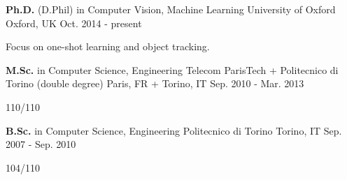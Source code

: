 

\begin{cventries}

  \cventry
    {\textbf{Ph.D.} (D.Phil) in Computer Vision, Machine Learning} %
    {University of Oxford} %
    {Oxford, UK} %
    {Oct. 2014 - present} %
    {
      \begin{cvitems} %
        \item {Focus on one-shot learning and object tracking.}
      \end{cvitems}
    }

  \cventry
    {\textbf{M.Sc.} in Computer Science, Engineering} %
    {Telecom ParisTech + Politecnico di Torino (double degree)} %
    {Paris, FR + Torino, IT} %
    {Sep. 2010 - Mar. 2013} %
    {
      \begin{cvitems} %
        \item {110/110}
      \end{cvitems}
    }

  \cventry
    {\textbf{B.Sc.} in Computer Science, Engineering} %
    {Politecnico di Torino} %
    {Torino, IT} %
    {Sep. 2007 - Sep. 2010} %
    {
      \begin{cvitems} %
        \item {104/110}
      \end{cvitems}
    }  
\end{cventries}
